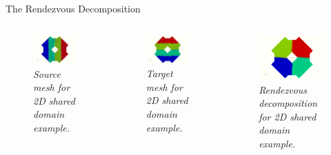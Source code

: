 \documentclass{beamer}
\begin{document}
\begin{frame}{The Rendezvous Decomposition}

  \begin{columns}

    \begin{column}{0.33\textwidth}
      \begin{figure}[htpb!]
        \centering \includegraphics[width=2in]{tri_part.png}
        \caption{\small \sl Source mesh for 2D shared domain
          example.}
        \label{fig:source_mesh}
      \end{figure}
    \end{column}

    \begin{column}{0.33\textwidth}
      \begin{figure}[htpb!]
        \centering \includegraphics[width=2in]{quad_part.png}
        \caption{\small \sl Target mesh for 2D shared domain
          example.}
        \label{fig:target_mesh}
      \end{figure}
    \end{column}

    \begin{column}{0.33\textwidth}
      \begin{figure}[htpb!]
        \centering \includegraphics[width=2in]{tri_rend.png}
        \caption{\small \sl Rendezvous decomposition for 2D shared domain
          example.}
        \label{fig:rendezvous_part}
      \end{figure}
    \end{column}

  \end{columns}

\end{frame}
\end{document}
